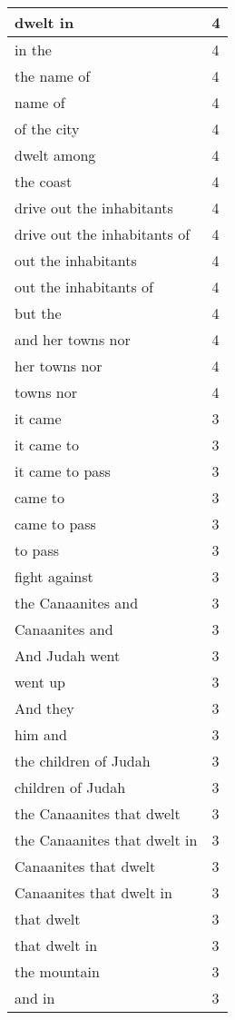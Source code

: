 \begin{center}
\begin{longtable}{|p{3.0in}|p{0.5in}|}
dwelt in & 4\\ \hline 
in the & 4\\ \hline 
the name of & 4\\ \hline 
name of & 4\\ \hline 
of the city & 4\\ \hline 
dwelt among & 4\\ \hline 
the coast & 4\\ \hline 
drive out the inhabitants & 4\\ \hline 
drive out the inhabitants of & 4\\ \hline 
out the inhabitants & 4\\ \hline 
out the inhabitants of & 4\\ \hline 
but the & 4\\ \hline 
and her towns nor & 4\\ \hline 
her towns nor & 4\\ \hline 
towns nor & 4\\ \hline 
it came & 3\\ \hline 
it came to & 3\\ \hline 
it came to pass & 3\\ \hline 
came to & 3\\ \hline 
came to pass & 3\\ \hline 
to pass & 3\\ \hline 
fight against & 3\\ \hline 
the Canaanites and & 3\\ \hline 
Canaanites and & 3\\ \hline 
And Judah went & 3\\ \hline 
went up & 3\\ \hline 
And they & 3\\ \hline 
him and & 3\\ \hline 
the children of Judah & 3\\ \hline 
children of Judah & 3\\ \hline 
the Canaanites that dwelt & 3\\ \hline 
the Canaanites that dwelt in & 3\\ \hline 
Canaanites that dwelt & 3\\ \hline 
Canaanites that dwelt in & 3\\ \hline 
that dwelt & 3\\ \hline 
that dwelt in & 3\\ \hline 
the mountain & 3\\ \hline 
and in & 3\\ \hline 

\end{longtable}
\end{center}
